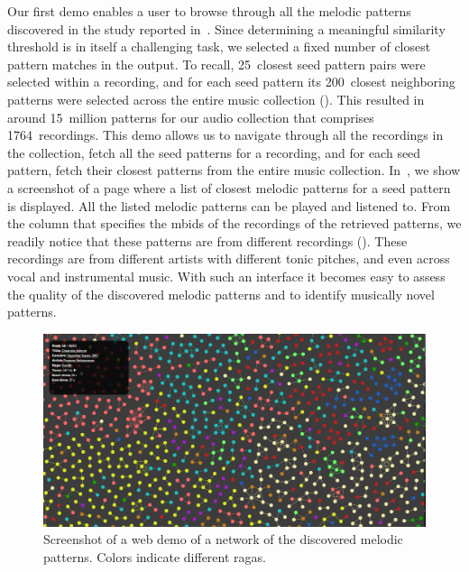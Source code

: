 Our first demo enables a user to browse through all the melodic patterns discovered in the study reported in~\secref{}. Since determining a meaningful similarity threshold is in itself a challenging task, we selected a fixed number of closest pattern matches in the output. To recall, 25~closest seed pattern pairs were selected within a recording, and for each seed pattern its 200~closest neighboring patterns were selected across the entire music collection (\secref{}). This resulted in around 15~million patterns for our audio collection that comprises 1764~recordings. This demo allows us to navigate through all the recordings in the collection, fetch all the seed patterns for a recording, and for each seed pattern, fetch their closest patterns from the entire music collection. In~, we show a screenshot of a page where a list of closest melodic patterns for a seed pattern is displayed. All the listed melodic patterns can be played and listened to. From the column that specifies the \glspl{mbid} of the recordings of the retrieved patterns, we readily notice that these patterns are from different recordings (). These recordings are from different artists with different tonic pitches, and even across vocal and instrumental music. With such an interface it becomes easy to assess the quality of the discovered melodic patterns and to identify musically novel patterns. 

\begin{figure}
	\begin{center}
		\includegraphics[width=\figSizeHundred]{ch08_applications/figures/patternNetwork1.png}
	\end{center}
	\caption[A web demo of a network of the discovered melodic patterns]{Screenshot of a web demo of a network of the discovered melodic patterns. Colors indicate different \glspl{raga}.}
	\label{fig:network_patterns}
\end{figure}

